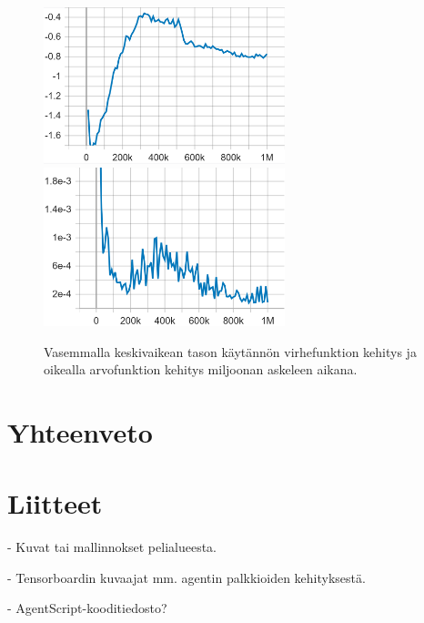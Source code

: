 \documentclass[utf8]{gradu3}
\begin{document}
\begin{figure}[h]
\includegraphics[width=7cm]{I_Policy_Loss.png}
\includegraphics[width=7cm]{I_Value_Loss.png}
\caption{Vasemmalla keskivaikean tason käytännön virhefunktion kehitys ja oikealla arvofunktion kehitys miljoonan askeleen aikana.}
\label{intermediateloss}
\end{figure}

\chapter{Yhteenveto}
\label{yhteenveto}

\printbibliography

\chapter{Liitteet}

- Kuvat tai mallinnokset pelialueesta.

- Tensorboardin kuvaajat mm. agentin palkkioiden kehityksestä.

- AgentScript-kooditiedosto?
\end{document}
